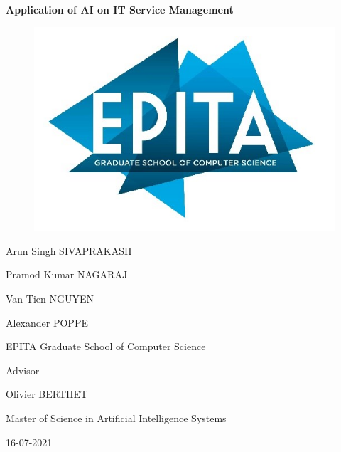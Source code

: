 \documentclass[a4paper,12pt]{report}
\author{}
\date{}
\begin{document}
    \begin{titlepage}
        \begin{center}
            
            \textbf{\Large Application of AI on IT Service Management}
                
            \vspace{1.5cm}

            \begin{figure}[h]
                \includegraphics[scale=1.0]{EPITA.jpg}
                \centering
            \end{figure}
    
            \begin{center}
                \centerline{Arun Singh SIVAPRAKASH}
                \centerline{Pramod Kumar NAGARAJ}
                \centerline{Van Tien NGUYEN}
                \centerline{Alexander POPPE}
            \end{center}
    
            \vfill

            \centerline{EPITA Graduate School of Computer Science}
            
                
            \begin{center}
                \centerline{Advisor}
                \centerline{ Olivier BERTHET}
            \end{center}
        
            \begin{center}
                Master of Science in Artificial Intelligence Systems
            \end{center}
        
            \vfill
            \centerline{16-07-2021}
                
        \end{center}
    \end{titlepage}
\end{document}
